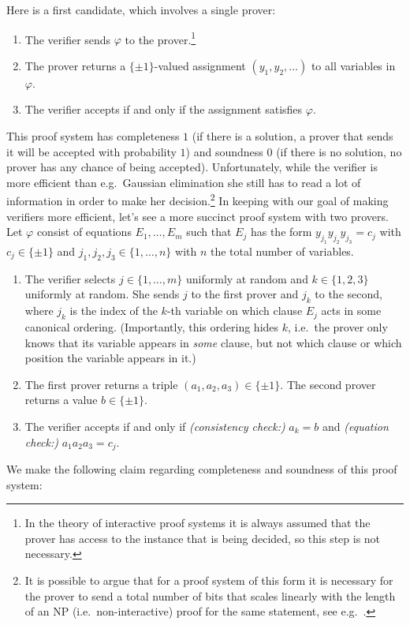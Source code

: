 Here is a first candidate, which involves a single prover:
\begin{enumerate}
\item The verifier sends $\varphi$ to the prover.\footnote{In the theory of interactive proof systems it is always assumed that the prover has access to the instance that is being decided, so this step is not necessary.}
\item The prover returns a $\{\pm 1\}$-valued assignment $(y_1,y_2,\ldots)$ to all variables in $\varphi$.
\item The verifier accepts if and only if the assignment satisfies $\varphi$. 
\end{enumerate}
This proof system has completeness $1$ (if there is a solution, a prover that sends it will be accepted with probability $1$) and soundness $0$ (if there is no solution, no prover has any chance of being accepted). Unfortunately, while the verifier is more efficient than e.g.\ Gaussian elimination she still has to read a lot of information in order to make her decision.\footnote{It is possible to argue that for a proof system of this form it is necessary for the prover to send a total number of bits that scales linearly with the length of an NP (i.e.\ non-interactive) proof for the same statement, see e.g.~\cite{goldreich2001interactive}.} In keeping with our goal of making verifiers more efficient, let's see a more succinct proof system with two provers. Let $\varphi$ consist of equations $E_1,\ldots,E_m$ such that $E_j$ has the form $y_{j_1} y_{j_2} y_{j_3}  = c_j$ with $c_j\in\{\pm 1\}$ and $j_1,j_2,j_3\in\{1,\ldots,n\}$ with $n$ the total number of variables. 
\begin{enumerate}
\item The verifier selects $j \in \{1,\ldots,m\}$ uniformly at random and $k\in\{1,2,3\}$ uniformly at random. She sends $j$ to the first prover and $j_k$ to the second, where $j_k$ is the index of the $k$-th variable on which clause $E_j$ acts in some canonical ordering. (Importantly, this ordering hides $k$, i.e.\ the prover only knows that its variable appears in \emph{some} clause, but not which clause or which position the variable appears in it.)
\item The first prover returns a triple $(a_1,a_2,a_3)\in \{\pm 1\}$. The second prover returns a value $b\in \{\pm 1\}$. 
\item The verifier accepts if and only if \emph{(consistency check:)} $a_k = b$ and \emph{(equation check:)} $a_1a_2a_3=c_j$. 
\end{enumerate}
We make the following claim regarding completeness and soundness of this proof system:

